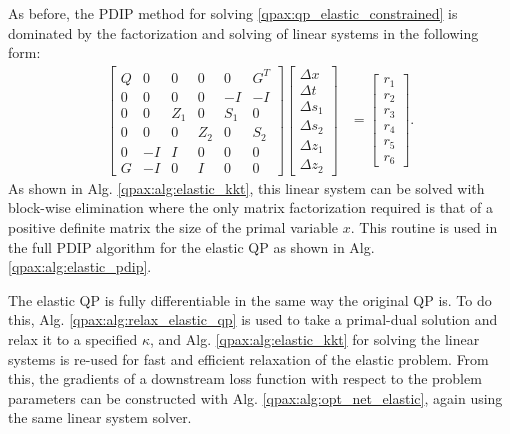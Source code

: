As before, the PDIP method for solving \eqref{qpax:qp_elastic_constrained} is dominated by the factorization and solving of linear systems in the following form:
    \begin{align}
        \begin{bmatrix} 
            Q & 0 & 0   & 0   & 0   & G^T \\ 
            0 & 0 & 0   & 0   & -I   & -I \\ 
            0 & 0 & Z_1 & 0   & S_1 & 0 \\ 
            0 & 0 & 0   & Z_2 & 0   & S_2 \\ 
            0 & -I & I & 0 & 0 & 0 \\ 
            G & -I & 0 & I & 0 & 0 
        \end{bmatrix} \begin{bmatrix}
            \Delta x \\ \Delta t \\ \Delta s_1 \\ \Delta s_2 \\ \Delta z_1 \\ \Delta z_2
        \end{bmatrix} &= \begin{bmatrix} r_1 \\ r_2 \\ r_3 \\ r_4 \\ r_5 \\ r_6 \end{bmatrix}.
    \end{align}
    As shown in Alg. \eqref{qpax:alg:elastic_kkt}, this linear system can be solved with block-wise elimination where the only matrix factorization required is that of a positive definite matrix the size of the primal variable $x$. This routine is used in the full PDIP algorithm for the elastic QP as shown in Alg. \eqref{qpax:alg:elastic_pdip}. 

    The elastic QP is fully differentiable in the same way the original QP is. To do this, Alg. \eqref{qpax:alg:relax_elastic_qp} is used to take a primal-dual solution and relax it to a specified $\kappa$, and  Alg. \eqref{qpax:alg:elastic_kkt} for solving the linear systems is re-used for fast and efficient relaxation of the elastic problem. From this, the gradients of a downstream loss function with respect to the problem parameters can be constructed with Alg. \eqref{qpax:alg:opt_net_elastic}, again using the same linear system solver. 

